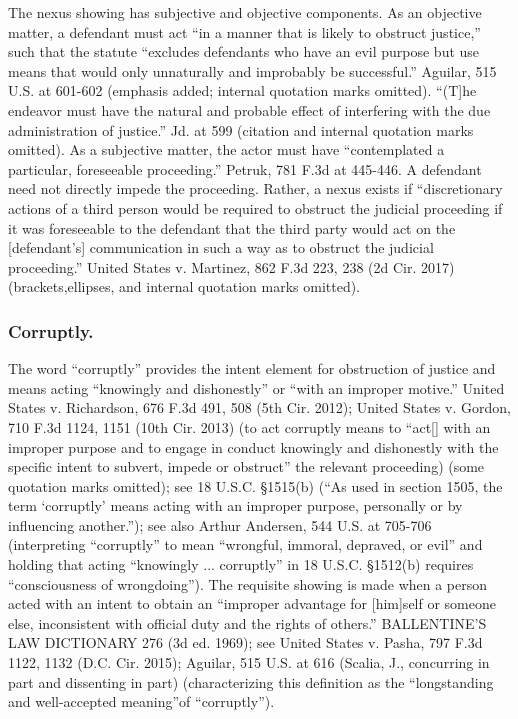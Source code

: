 The nexus showing has subjective and objective components. 
As an objective matter, a defendant must act “in a manner that is likely to obstruct justice,” such that the statute “excludes defendants who have an evil purpose but use means that would only unnaturally and improbably be successful.” 
Aguilar, 515 U.S. at 601-602 (emphasis added; internal quotation marks omitted). 
“(T]he endeavor must have the natural and probable effect of interfering with the due administration of justice.” 
Jd. at 599 (citation and internal quotation marks omitted). 
As a subjective matter, the actor must have “contemplated a particular, foreseeable proceeding.” 
Petruk, 781 F.3d at 445-446. 
A defendant need not directly impede the proceeding. 
Rather, a nexus exists if “discretionary actions of a third person would be required to obstruct the judicial proceeding if it was foreseeable to the defendant that the third party would act on the [defendant’s] communication in such a way as to obstruct the judicial proceeding.” 
United States v. Martinez, 862 F.3d 223, 238 (2d Cir. 2017) (brackets,ellipses, and internal quotation marks omitted). 

\subsubsection*{Corruptly.}
The word “corruptly” provides the intent element for obstruction of justice and means acting “knowingly and dishonestly” or “with an improper motive.” 
United States v. Richardson, 676 F.3d 491, 508 (5th Cir. 2012); 
United States v. Gordon, 710 F.3d 1124, 1151 (10th Cir. 2013) (to act corruptly means to “act[] with an improper purpose and to engage in conduct knowingly and dishonestly with the specific intent to subvert, impede or obstruct” the relevant proceeding) (some quotation marks omitted); 
see 18 U.S.C. \S 1515(b) (“As used in section 1505, the term ‘corruptly’ means acting with an improper purpose, personally or by influencing another.”); 
see also Arthur Andersen, 544 U.S. at 705-706 (interpreting “corruptly” to mean “wrongful, immoral, depraved, or evil” and holding that acting “knowingly ... corruptly” in 18 U.S.C. \S 1512(b) requires “consciousness of wrongdoing”). 
The requisite showing is made when a person acted with an intent to obtain an “improper advantage for [him]self or someone else, inconsistent with official duty and the rights of others.” 
BALLENTINE’S LAW DICTIONARY 276 (3d ed. 1969); 
see United States v. Pasha, 797 F.3d 1122, 1132 (D.C. Cir. 2015); 
Aguilar, 515 U.S. at 616 (Scalia, J., concurring in part and dissenting in part) (characterizing this definition as the “longstanding and well-accepted meaning”of “corruptly”). 

